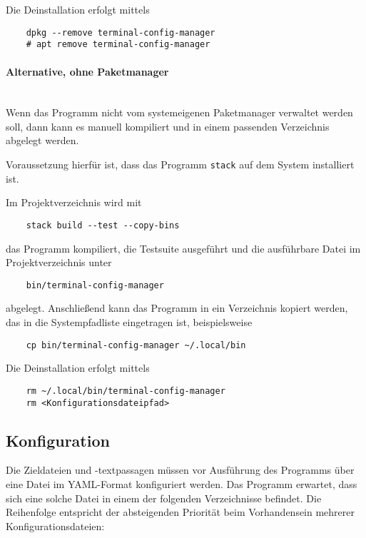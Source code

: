 \documentclass[a4paper,11pt]{scrartcl} %
\begin{document}
Die Deinstallation erfolgt mittels

\begin{verbatim}
	dpkg --remove terminal-config-manager
	# apt remove terminal-config-manager
\end{verbatim}

\paragraph{Alternative, ohne Paketmanager}\mbox{}\\
Wenn das Programm nicht vom systemeigenen Paketmanager verwaltet werden
soll, dann kann es manuell kompiliert und in einem passenden
Verzeichnis abgelegt werden.

Voraussetzung hierfür ist, dass das Programm \texttt{stack} auf dem
System installiert ist.

Im Projektverzeichnis wird mit

\begin{verbatim}
	stack build --test --copy-bins
\end{verbatim}

das Programm kompiliert, die Testsuite ausgeführt und die ausführbare Datei im
Projektverzeichnis unter

\begin{verbatim}
	bin/terminal-config-manager
\end{verbatim}

abgelegt. Anschließend kann das Programm in ein Verzeichnis kopiert werden, das in die
Systempfadliste eingetragen ist, beispielsweise

\begin{verbatim}
	cp bin/terminal-config-manager ~/.local/bin
\end{verbatim}

Die Deinstallation erfolgt mittels

\begin{verbatim}
	rm ~/.local/bin/terminal-config-manager
	rm <Konfigurationsdateipfad>
\end{verbatim}

\subsection{Konfiguration}
Die Zieldateien und -textpassagen müssen vor Ausführung des Programms
über eine Datei im YAML-Format konfiguriert werden.
Das Programm erwartet, dass sich eine solche Datei in einem der folgenden
Verzeichnisse befindet. Die Reihenfolge entspricht der absteigenden Priorität
beim Vorhandensein mehrerer Konfigurationsdateien:
\end{document}
